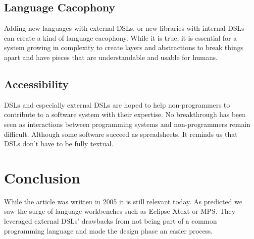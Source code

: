 \documentclass{proc}
\begin{document}
\subsection{Language Cacophony}
Adding new languages with external DSLs, or new libraries with internal DSLs can
create a kind of language cacophony. While it is true, it is essential for a
system growing in complexity to create layers and abstractions to break things
apart and have pieces that are understandable and usable for humans.

\subsection{Accessibility}
DSLs and especially external DSLs are hoped to help non-programmers to
contribute to a software system with their expertise. No breakthrough has been
seen as interactions between programming systems and non-programmers remain
difficult. Although some software succeed as spreadsheets. It reminds us that
DSLs don't have to be fully textual.


\section{Conclusion}
\label{conclusion}
While the article was written in 2005 it is still relevant today. As predicted
we saw the surge of language workbenches such as Eclipse Xtext or MPS\@. They
leveraged external DSLs' drawbacks from not being part of a common programming
language and made the design phase an easier process.
\end{document}
